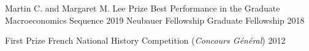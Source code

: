 

\begin{cvhonors}

	\cvhonor
	{Martin C. and Margaret M. Lee Prize} %
	{Best Performance in the Graduate Macroeconomics Sequence} %
	{} %
	{2019} %
	\cvhonor
	{Neubauer Fellowship} %
	{Graduate Fellowship} %
	{} %
	{2018} %

	\cvhonor
	{First Prize} %
	{French National History Competition (\textit{Concours Général})} %
	{} %
	{2012} %

\end{cvhonors}
